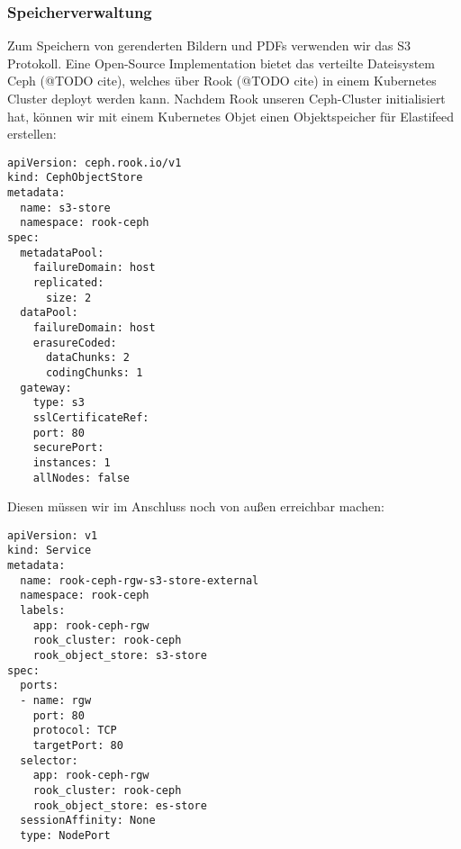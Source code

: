 \subsubsection{Speicherverwaltung}
Zum Speichern von gerenderten Bildern und PDFs verwenden wir das S3 Protokoll.
Eine Open-Source Implementation bietet das verteilte Dateisystem Ceph (@TODO cite), welches über Rook (@TODO cite) in einem Kubernetes Cluster deployt werden kann.
Nachdem Rook unseren Ceph-Cluster initialisiert hat, können wir mit einem Kubernetes Objet einen Objektspeicher für Elastifeed erstellen:
\begin{lstlisting}
apiVersion: ceph.rook.io/v1
kind: CephObjectStore
metadata:
  name: s3-store
  namespace: rook-ceph
spec:
  metadataPool:
    failureDomain: host
    replicated:
      size: 2
  dataPool:
    failureDomain: host
    erasureCoded:
      dataChunks: 2
      codingChunks: 1
  gateway:
    type: s3
    sslCertificateRef:
    port: 80
    securePort:
    instances: 1
    allNodes: false
\end{lstlisting}
Diesen müssen wir im Anschluss noch von außen erreichbar machen:
\begin{lstlisting}
apiVersion: v1
kind: Service
metadata:
  name: rook-ceph-rgw-s3-store-external
  namespace: rook-ceph
  labels:
    app: rook-ceph-rgw
    rook_cluster: rook-ceph
    rook_object_store: s3-store
spec:
  ports:
  - name: rgw
    port: 80
    protocol: TCP
    targetPort: 80
  selector:
    app: rook-ceph-rgw
    rook_cluster: rook-ceph
    rook_object_store: es-store
  sessionAffinity: None
  type: NodePort
\end{lstlisting}
\endsubsubsection

\endsubsection

\endsection